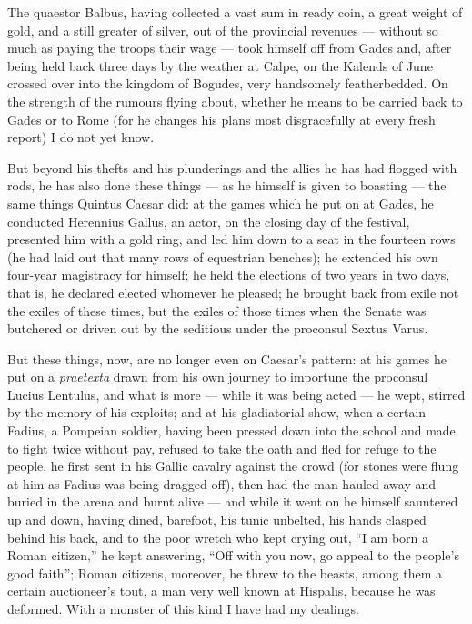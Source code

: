 

 The quaestor Balbus, having collected a vast sum in ready coin, a great weight of gold, and a still greater of silver, out of the provincial revenues --- without so much as paying the troops their wage --- took himself off from Gades and, after being held back three days by the weather at Calpe, on the Kalends of June crossed over into the kingdom of Bogudes, very handsomely featherbedded. On the strength of the rumours flying about, whether he means to be carried back to Gades or to Rome (for he changes his plans most disgracefully at every fresh report) I do not yet know.

 But beyond his thefts and his plunderings and the allies he has had flogged with rods, he has also done these things --- as he himself is given to boasting --- the same things Quintus Caesar did: at the games which he put on at Gades, he conducted Herennius Gallus, an actor, on the closing day of the festival, presented him with a gold ring, and led him down to a seat in the fourteen rows (he had laid out that many rows of equestrian benches); he extended his own four-year magistracy for himself; he held the elections of two years in two days, that is, he declared elected whomever he pleased; he brought back from exile not the exiles of these times, but the exiles of those times when the Senate was butchered or driven out by the seditious under the proconsul Sextus Varus.

 But these things, now, are no longer even on Caesar's pattern: at his games he put on a \textit{praetexta} drawn from his own journey to importune the proconsul Lucius Lentulus, and what is more --- while it was being acted --- he wept, stirred by the memory of his exploits; and at his gladiatorial show, when a certain Fadius, a Pompeian soldier, having been pressed down into the school and made to fight twice without pay, refused to take the oath and fled for refuge to the people, he first sent in his Gallic cavalry against the crowd (for stones were flung at him as Fadius was being dragged off), then had the man hauled away and buried in the arena and burnt alive --- and while it went on he himself sauntered up and down, having dined, barefoot, his tunic unbelted, his hands clasped behind his back, and to the poor wretch who kept crying out, ``I am born a Roman citizen,'' he kept answering, ``Off with you now, go appeal to the people's good faith''; Roman citizens, moreover, he threw to the beasts, among them a certain auctioneer's tout, a man very well known at Hispalis, because he was deformed. With a monster of this kind I have had my dealings.

